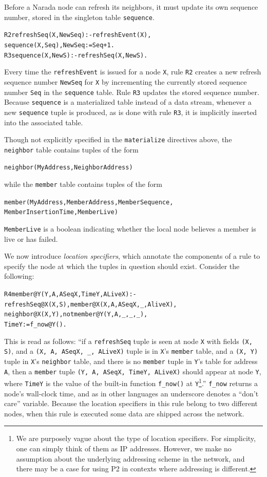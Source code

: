 \documentclass{sig-alt-full}
\def\Sys{P2\xspace}
\newcommand{\ol}[1]{{\tt\footnotesize#1}}
\newenvironment{overlog}{\begin{alltt}\small}{\end{alltt}}
\begin{document}
Before a Narada node can refresh its neighbors, it must update its own
sequence number, stored in the singleton table \ol{sequence}.

\begin{overlog}
R2 refreshSeq(X, NewSeq) :- refreshEvent(X),
  sequence(X, Seq), NewSeq := Seq + 1.
R3 sequence(X, NewS) :- refreshSeq(X, NewS).
\end{overlog}

\noindent{}Every time the \ol{refreshEvent} is issued for a node
\ol{X}, rule \ol{R2}
creates a new refresh sequence number \ol{NewSeq} for \ol{X} by
incrementing the 
currently stored sequence number \ol{Seq} in the \ol{sequence} table.
Rule \ol{R3} updates the stored sequence number.  Because \ol{sequence}
is a materialized table instead of a data stream, whenever a new
\ol{sequence} tuple is produced, as is done with rule \ol{R3}, it is
implicitly inserted into the associated table.

Though not explicitly specified in the \ol{materialize} directives
above, the \ol{neighbor} table contains tuples of the form
\begin{overlog}
neighbor(MyAddress, NeighborAddress)
\end{overlog}
while the \ol{member} table
contains tuples of the form
\begin{overlog}
member(MyAddress, MemberAddress, MemberSequence,
  MemberInsertionTime, MemberLive)
\end{overlog}
\ol{MemberLive} is a boolean indicating whether the
local node believes a member is live or has failed.

We now introduce {\em location specifiers}, which annotate the components of a
rule to specify the node at which the tuples in question should exist.
Consider the following:

\begin{overlog}
R4 member@Y(Y, A, ASeqX, TimeY, ALiveX) :-
  refreshSeq@X(X, S), member@X(X, A, ASeqX, _, AliveX), 
  neighbor@X(X, Y), not member@Y(Y, A, _, _, _), 
  TimeY := f_now@Y().
\end{overlog}

\noindent{}This is read as follows: ``if a \ol{refreshSeq} tuple is seen
at node \ol{X} with fields \ol{(X, S)}, and a \ol{(X, A, ASeqX, \_,
ALiveX)} tuple is in \ol{X}'s \ol{member} table, and a \ol{(X, Y)} tuple in
\ol{X}'s \ol{neighbor} table, and there is no \ol{member} tuple in
\ol{Y}'s table for address \ol{A}, then a \ol{member} tuple \ol{(Y, A,
ASeqX, TimeY, ALiveX)} should appear at node \ol{Y}, where \ol{TimeY} is
the value of the built-in function \ol{f\_now()} at \ol{Y}\footnote{We
are purposely vague about the type of location specifiers.  For
simplicity, one can simply think of them as IP addresses.  However, we
make no assumption about the underlying addressing scheme in the
network, and there may be a case for using \Sys in contexts where
addressing is different.}.'' \ol{f\_now} returns a node's wall-clock
time, and as in other languages an underscore denotes a
``don't care'' variable.  Because the location specifiers in this rule
belong to two 
different nodes, when this rule is executed some data are shipped across
the network.
\end{document}
